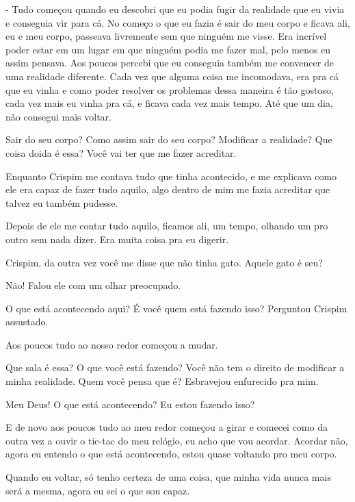- Tudo começou quando eu descobri que eu podia fugir da realidade que eu vivia e conseguia vir para cá. No começo o que eu fazia é sair do meu corpo e ficava ali, eu e meu corpo, passeava livremente sem que ninguém me visse. Era incrível poder estar em um lugar em que ninguém podia me fazer mal, pelo menos eu assim pensava. Aos poucos percebi que eu conseguia também me convencer de uma realidade diferente. Cada vez que alguma coisa me incomodava, era pra cá que eu vinha e como poder resolver os problemas dessa maneira é tão gostoso, cada vez mais eu vinha pra cá, e ficava cada vez mais tempo. Até que um dia, não consegui mais voltar.

Sair do seu corpo? Como assim sair do seu corpo? Modificar a realidade? Que coisa doida é essa? Você vai ter que me fazer acreditar.

Enquanto Crispim me contava tudo que tinha acontecido, e me explicava como ele era capaz de fazer tudo aquilo, algo dentro de mim me fazia acreditar que talvez eu também pudesse.

Depois de ele me contar tudo aquilo, ficamos ali, um tempo, olhando um pro outro sem nada dizer. Era muita coisa pra eu digerir.

Crispim, da outra vez você me disse que não tinha gato. Aquele gato é seu?

Não! Falou ele com um olhar preocupado.

O que está acontecendo aqui? É você quem está fazendo isso? Perguntou Crispim assustado.

Aos poucos tudo ao nosso redor começou a mudar.

Que sala é essa? O que você está fazendo? Você não tem o direito de modificar a minha realidade. Quem você pensa que é? Esbravejou enfurecido pra mim.

Meu Deus! O que está acontecendo? Eu estou fazendo isso?

E de novo aos poucos tudo ao meu redor começou a girar e comecei como da outra vez a ouvir o tic-tac do meu relógio, eu acho que vou acordar. Acordar não, agora eu entendo o que está acontecendo, estou quase voltando pro meu corpo.

Quando eu voltar, só tenho certeza de uma coisa, que minha vida nunca mais será a mesma, agora eu sei o que sou capaz.


